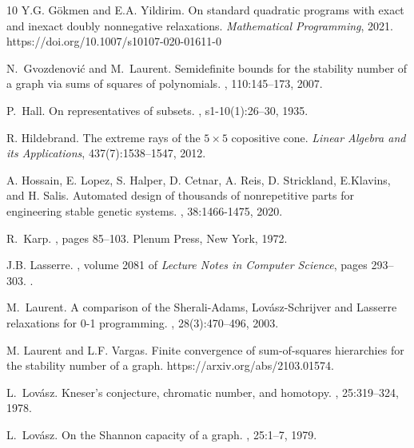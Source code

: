 \documentclass[11pt]{article}
\numberwithin{equation}{section}
\begin{document}
\begin{thebibliography}{10}
Y.G. G\"okmen and E.A. Yildirim.
On standard quadratic programs with exact and inexact doubly nonnegative relaxations.
{\em Mathematical Programming}, 2021. https://doi.org/10.1007/s10107-020-01611-0

N.~Gvozdenovi{\'c} and M.~Laurent.
\newblock Semidefinite bounds for the stability number of a graph via sums of
  squares of polynomials.
, 110:145--173, 2007.



P.~Hall.
\newblock On representatives of subsets.
, s1-10(1):26--30,
  1935.
  
  R. Hildebrand.
  The extreme rays of the $5\times 5$ copositive cone.
  {\em Linear Algebra and its Applications}, 437(7):1538--1547, 2012.
  
  A. Hossain, E. Lopez, S. Halper, D. Cetnar, A. Reis, D. Strickland, E.Klavins, and H. Salis.
Automated design of thousands of nonrepetitive parts for engineering stable genetic systems.
  , 38:1466-1475, 2020.
  
R.~Karp.
, pages 85--103.
\newblock Plenum Press, New York, 1972.  
  
J.B. Lasserre.
,
  volume 2081 of {\em Lecture Notes in Computer Science}, pages 293--303.
.
  
M.~Laurent.
\newblock A comparison of the {S}herali-{A}dams, {L}ov\'asz-{S}chrijver and
  {L}asserre relaxations for 0-1 programming.
, 28(3):470--496, 2003.
  
M. Laurent and L.F. Vargas.
\newblock Finite convergence of sum-of-squares hierarchies for the stability number of a graph.
\newblock https://arxiv.org/abs/2103.01574.
  
L.~Lov{\'a}sz.
\newblock Kneser's conjecture, chromatic number, and homotopy.
, 25:319--324, 1978.  

L.~Lov\'asz.
\newblock On the {S}hannon capacity of a graph.
, 25:1--7, 1979.


\end{thebibliography}
\end{document}
